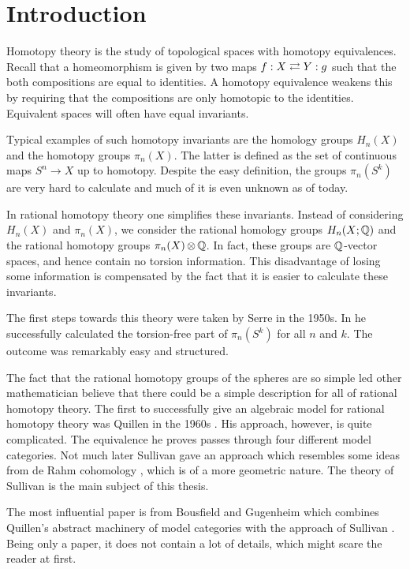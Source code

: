 
\chapter*{Introduction}

Homotopy theory is the study of topological spaces with homotopy equivalences. Recall that a homeomorphism is given by two maps $f : X \rightleftarrows Y : g$ such that the both compositions are equal to identities. A homotopy equivalence weakens this by requiring that the compositions are only homotopic to the identities. Equivalent spaces will often have equal invariants.

Typical examples of such homotopy invariants are the homology groups $H_n(X)$ and the homotopy groups $\pi_n(X)$. The latter is defined as the set of continuous maps $S^n \to X$ up to homotopy. Despite the easy definition, the groups $\pi_n(S^k)$ are very hard to calculate and much of it is even unknown as of today.

In rational homotopy theory one simplifies these invariants. Instead of considering $H_n(X)$ and $\pi_n(X)$, we consider the rational homology groups $H_n(X; \mathbb{Q})$ and the rational homotopy groups $\pi_n(X) \operatorname*{\otimes} \mathbb{Q}$. In fact, these groups are $\mathbb{Q}$-vector spaces, and hence contain no torsion information. This disadvantage of losing some information is compensated by the fact that it is easier to calculate these invariants.

The first steps towards this theory were taken by Serre in the 1950s. In \cite{serre} he successfully calculated the torsion-free part of $\pi_n(S^k)$ for all $n$ and $k$. The outcome was remarkably easy and structured.

The fact that the rational homotopy groups of the spheres are so simple led other mathematician believe that there could be a simple description for all of rational homotopy theory. The first to successfully give an algebraic model for rational homotopy theory was Quillen in the 1960s \cite{quillen}. His approach, however, is quite complicated. The equivalence he proves passes through four different model categories. Not much later Sullivan gave an approach which resembles some ideas from de Rahm cohomology \cite{sullivan}, which is of a more geometric nature. The theory of Sullivan is the main subject of this thesis.

The most influential paper is from Bousfield and Gugenheim which combines Quillen's abstract machinery of model categories with the approach of Sullivan \cite{bousfield}. Being only a paper, it does not contain a lot of details, which might scare the reader at first.


